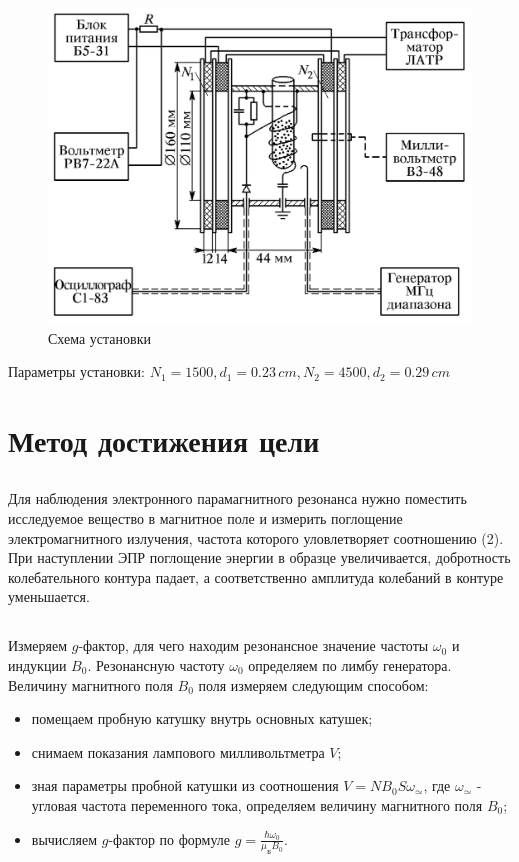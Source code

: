 \documentclass[a4paper,12pt]{article}
\begin{document}
\begin{figure}[h!]
    \begin{center}
        \begin{minipage}{0.49\linewidth}
            \centering
            \includegraphics[width=0.9\linewidth]{exp.png}
            \caption{Схема установки}
        \end{minipage}
    \end{center}
\end{figure}        
    
Параметры установки: $N_1 = 1500, d_1 = 0.23\,cm, N_2 = 4500, d_2=0.29\,cm$
\section{Метод достижения цели}
\subsection{}
Для наблюдения электронного парамагнитного резонанса нужно поместить 
исследуемое вещество в магнитное поле и измерить поглощение электромагнитного
излучения, частота которого уловлетворяет соотношению (2).\\
При наступлении ЭПР поглощение энергии в образце увеличивается, добротность
колебательного контура падает, а соответственно амплитуда колебаний в контуре уменьшается.
\subsection{}
Измеряем $g$-фактор, для чего находим резонансное значение частоты $\omega_0$ и индукции $B_0$.
Резонансную частоту $\omega_0$ определяем по лимбу генератора.\\
Величину магнитного поля $B_0$ поля измеряем следующим способом:
\begin{itemize}
    \item помещаем пробную катушку внутрь основных катушек;
    \item снимаем показания лампового милливольтметра $V$;
    \item зная параметры пробной катушки из соотношения $V=NB_0S\omega_\simeq$, где $\omega_\simeq$ - угловая частота переменного тока, определяем величину магнитного поля $B_0$;
    \item вычисляем $g$-фактор по формуле $g=\frac{\hbar\omega_0}{\mu_\text{Б}B_0}$.
\end{itemize}
\end{document}
